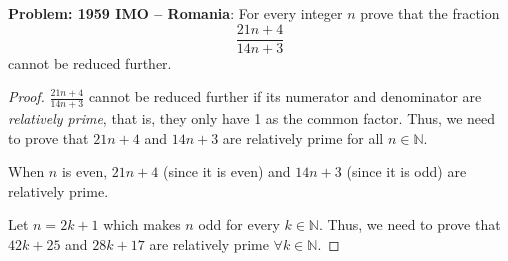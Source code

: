 \documentclass[a4paper]{article}
\begin{document}
\textbf{Problem: 1959 IMO -- Romania}: For every integer $n$ prove that the fraction 
$$
\frac{21n + 4}{14n + 3}
$$
cannot be reduced further.
\begin{proof}
    $\frac{21n+4}{14n+3}$ cannot be reduced further if its numerator and denominator are \emph{relatively prime}, that is, they only have 1 as the common factor. Thus, we need to prove that $21n+4$ and $14n+3$ are relatively prime for all $n \in \mathbb{N}$.
    
    When $n$ is even, $21n+4$ (since it is even) and $14n+3$ (since it is odd) are relatively prime.

    Let $n=2k+1$ which makes $n$ odd for every $k \in \mathbb{N}$. Thus, we need to prove that $42k+25$ and $28k+17$ are relatively prime $\forall k \in \mathbb{N}$.

\end{proof}
\end{document}
